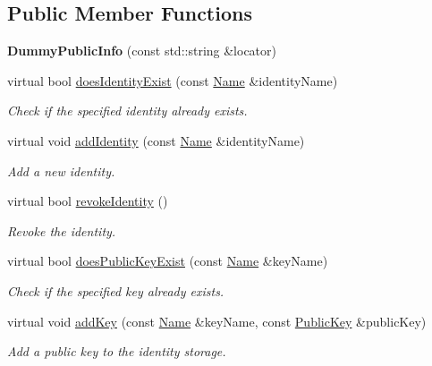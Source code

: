\subsection*{Public Member Functions}
\begin{DoxyCompactItemize}
\item 
{\bfseries Dummy\+Public\+Info} (const std\+::string \&locator)\hypertarget{classndn_1_1security_1_1DummyPublicInfo_a6c2bb286d17aecb49f7ba707d4465b01}{}\label{classndn_1_1security_1_1DummyPublicInfo_a6c2bb286d17aecb49f7ba707d4465b01}

\item 
virtual bool \hyperlink{classndn_1_1security_1_1DummyPublicInfo_a3db92de01fea8867fa0faa0fb4a43bf3}{does\+Identity\+Exist} (const \hyperlink{classndn_1_1Name}{Name} \&identity\+Name)
\begin{DoxyCompactList}\small\item\em Check if the specified identity already exists. \end{DoxyCompactList}\item 
virtual void \hyperlink{classndn_1_1security_1_1DummyPublicInfo_a3d8ddc1f27eedc94a6f1b2d13643281f}{add\+Identity} (const \hyperlink{classndn_1_1Name}{Name} \&identity\+Name)
\begin{DoxyCompactList}\small\item\em Add a new identity. \end{DoxyCompactList}\item 
virtual bool \hyperlink{classndn_1_1security_1_1DummyPublicInfo_a20f74664d137bb21dd218db237525832}{revoke\+Identity} ()
\begin{DoxyCompactList}\small\item\em Revoke the identity. \end{DoxyCompactList}\item 
virtual bool \hyperlink{classndn_1_1security_1_1DummyPublicInfo_adf290853f97bd158e6470831a9194862}{does\+Public\+Key\+Exist} (const \hyperlink{classndn_1_1Name}{Name} \&key\+Name)
\begin{DoxyCompactList}\small\item\em Check if the specified key already exists. \end{DoxyCompactList}\item 
virtual void \hyperlink{classndn_1_1security_1_1DummyPublicInfo_afb4b462d295f2af79efb2b864d89d13c}{add\+Key} (const \hyperlink{classndn_1_1Name}{Name} \&key\+Name, const \hyperlink{classndn_1_1PublicKey}{Public\+Key} \&public\+Key)
\begin{DoxyCompactList}\small\item\em Add a public key to the identity storage. \end{DoxyCompactList}\item 

\end{DoxyCompactItemize}
